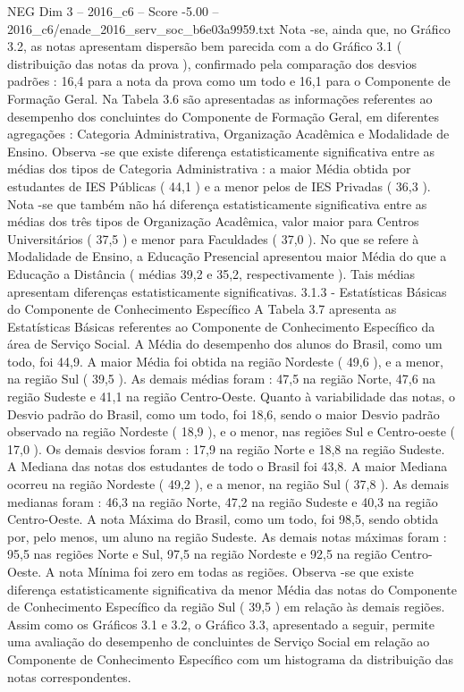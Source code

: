 \begin{textsample}{NEG Dim 3 – 2016\_c6 – Score -5.00 – 2016\_c6/enade\_2016\_serv\_soc\_b6e03a9959.txt}
Nota -se, ainda que, no Gráfico 3.2, as notas apresentam dispersão bem parecida com a do Gráfico 3.1 ( distribuição das notas da prova ), confirmado pela comparação dos desvios padrões : 16,4 para a nota da prova como um todo e 16,1 para o Componente de Formação Geral.
Na Tabela 3.6 são apresentadas as informações referentes ao desempenho dos concluintes do Componente de Formação Geral, em diferentes agregações : Categoria Administrativa, Organização Acadêmica e Modalidade de Ensino.
Observa -se que existe diferença estatisticamente significativa entre as médias dos tipos de Categoria Administrativa : a maior Média obtida por estudantes de IES Públicas ( 44,1 ) e a menor pelos de IES Privadas ( 36,3 ).
Nota -se que também não há diferença estatisticamente significativa entre as médias dos três tipos de Organização Acadêmica, valor maior para Centros Universitários ( 37,5 ) e menor para Faculdades ( 37,0 ).
No que se refere à Modalidade de Ensino, a Educação Presencial apresentou maior Média do que a Educação a Distância ( médias 39,2 e 35,2, respectivamente ).
Tais médias apresentam diferenças estatisticamente significativas. 3.1.3 - Estatísticas Básicas do Componente de Conhecimento Específico A Tabela 3.7 apresenta as Estatísticas Básicas referentes ao Componente de Conhecimento Específico da área de Serviço Social.
A Média do desempenho dos alunos do Brasil, como um todo, foi 44,9.
A maior Média foi obtida na região Nordeste ( 49,6 ), e a menor, na região Sul ( 39,5 ).
As demais médias foram : 47,5 na região Norte, 47,6 na região Sudeste e 41,1 na região Centro-Oeste.
Quanto à variabilidade das notas, o Desvio padrão do Brasil, como um todo, foi 18,6, sendo o maior Desvio padrão observado na região Nordeste ( 18,9 ), e o menor, nas regiões Sul e Centro-oeste ( 17,0 ).
Os demais desvios foram : 17,9 na região Norte e 18,8 na região Sudeste.
A Mediana das notas dos estudantes de todo o Brasil foi 43,8.
A maior Mediana ocorreu na região Nordeste ( 49,2 ), e a menor, na região Sul ( 37,8 ).
As demais medianas foram : 46,3 na região Norte, 47,2 na região Sudeste e 40,3 na região Centro-Oeste.
A nota Máxima do Brasil, como um todo, foi 98,5, sendo obtida por, pelo menos, um aluno na região Sudeste.
As demais notas máximas foram : 95,5 nas regiões Norte e Sul, 97,5 na região Nordeste e 92,5 na região Centro-Oeste.
A nota Mínima foi zero em todas as regiões.
Observa -se que existe diferença estatisticamente significativa da menor Média das notas do Componente de Conhecimento Específico da região Sul ( 39,5 ) em relação às demais regiões.
Assim como os Gráficos 3.1 e 3.2, o Gráfico 3.3, apresentado a seguir, permite uma avaliação do desempenho de concluintes de Serviço Social em relação ao Componente de Conhecimento Específico com um histograma da distribuição das notas correspondentes.

\end{textsample}
